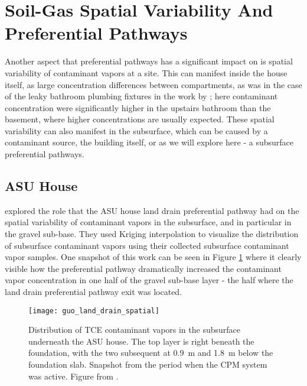\section{Soil-Gas Spatial Variability And Preferential Pathways}

Another aspect that preferential pathways has a significant impact on is spatial variability of contaminant vapors at a site.
This can manifest inside the house itself, as large concentration differences between compartments, as was in the case of the leaky bathroom plumbing fixtures in the work by \citeauthor{pennell_sewer_2013}\cite{pennell_sewer_2013}; here contaminant concentration were significantly higher in the upstairs bathroom than the basement, where higher concentrations are usually expected.
These spatial variability can also manifest in the subsurface, which can be caused by a contaminant source\cite{chow_concentration_2007}, the building itself\cite{holton_creation_2018}, or as we will explore here - a subsurface preferential pathways.

\subsection{ASU House}

\citeauthor{guo_identification_2015}\cite{guo_identification_2015} explored the role that the ASU house land drain preferential pathway had on the spatial variability of contaminant vapors in the subsurface, and in particular in the gravel sub-base.
They used Kriging interpolation to visualize the distribution of subsurface contaminant vapors using their collected subsurface contaminant vapor samples.
One snapshot of this work can be seen in Figure \ref{fig:guo_spatial_variability} where it clearly visible how the preferential pathway dramatically increased the contaminant vapor concentration in one half of the gravel sub-base layer - the half where the land drain preferential pathway exit was located.\par

\begin{figure}[htb!]
  \centering
  \texttt{[image: guo\_land\_drain\_spatial]}
  \caption{Distribution of TCE contaminant vapors in the subsurface underneath the ASU house. The top layer is right beneath the foundation, with the two subsequent at \SI{0.9}{\metre} and \SI{1.8}{\metre} below the foundation slab. Snapshot from the period when the CPM system was active. Figure from \citeauthor{guo_identification_2015}\cite{guo_identification_2015}.}
  \label{fig:guo_spatial_variability}
\end{figure}


